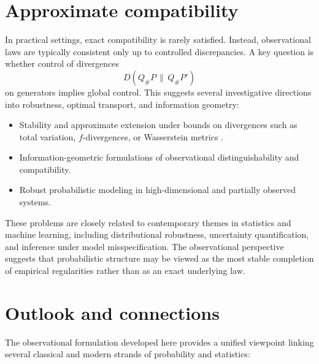 \section{Approximate compatibility}

In practical settings, exact compatibility is rarely satisfied. Instead, observational laws are typically consistent only up to controlled discrepancies. A key question is whether control of divergences
\[
D(Q_\# P \,\|\, Q_\# P')
\]
on generators implies global control. This suggests several investigative directions into robustness, optimal transport, and information geometry:
\begin{itemize}
\item Stability and approximate extension under bounds on divergences such as total variation, $f$-divergences, or Wasserstein metrics \cite{Villani}.
\item Information-geometric formulations of observational distinguishability and compatibility.
\item Robust probabilistic modeling in high-dimensional and partially observed systems.
\end{itemize}

These problems are closely related to contemporary themes in statistics and machine learning, including distributional robustness, uncertainty quantification, and inference under model misspecification. The observational perspective suggests that probabilistic structure may be viewed as the most stable completion of empirical regularities rather than as an exact underlying law.

\section{Outlook and connections}
\label{sec:outlook}

The observational formulation developed here provides a unified viewpoint linking several classical and modern strands of probability and statistics:

